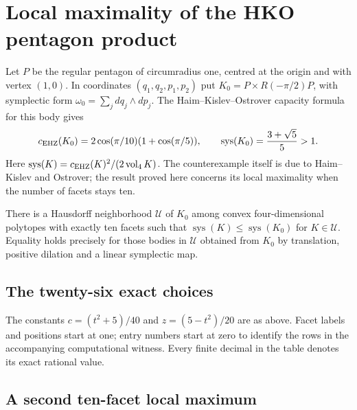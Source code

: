 \clearpage
\section[HKO Local Maximality]{Local maximality of the HKO pentagon product}
\label{sec:hko-local-maximum}
Let $P$ be the regular pentagon of circumradius one, centred at the origin
and with vertex $(1,0)$. In coordinates $(q_1,q_2,p_1,p_2)$ put
$K_0=P\times R(-\pi/2)P$, with symplectic form
$\omega_0=\sum_j dq_j\wedge dp_j$.
The Haim--Kislev--Ostrover capacity formula~\cite{HaimKislevOstrover2024} for this body gives
\[
 c_{\rm EHZ}(K_0)=2\cos(\pi/10)(1+\cos(\pi/5)),\qquad
 \operatorname{sys}(K_0)=\frac{3+\sqrt5}{5}>1.
\]
Here $\operatorname{sys}(K)=c_{\rm EHZ}(K)^2/(2\operatorname{vol}_4 K)$.
The counterexample itself is due to Haim--Kislev and Ostrover; the result
proved here concerns its local maximality when the number of facets stays ten.
\begin{theorem}\label{thm:hko-ten-facet-local-maximum}
There is a Hausdorff neighborhood $\mathcal U$ of $K_0$ among convex
four-dimensional polytopes with exactly ten facets such that
$\operatorname{sys}(K)\leq\operatorname{sys}(K_0)$ for $K\in\mathcal U$.
Equality holds precisely for those bodies in $\mathcal U$ obtained from
$K_0$ by translation, positive dilation and a linear symplectic map.
\end{theorem}



\clearpage
\subsection*{The twenty-six exact choices}
\label{page:hko-exact-choices}
The constants $c=(t^2+5)/40$ and $z=(5-t^2)/20$ are as above.
Facet labels and positions start at one; entry numbers start at zero to
identify the rows in the accompanying computational witness.
Every finite decimal in the table denotes its exact rational value.
\begingroup
\small\renewcommand{\arraystretch}{1.25}
\renewcommand{\baselinestretch}{1.2}\selectfont

\endgroup

\subsection{A second ten-facet local maximum}
\label{subsec:non-hko-local-maximum}

